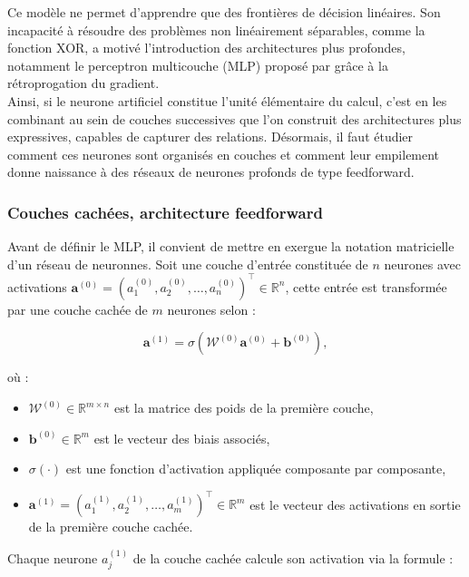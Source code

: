 Ce modèle ne permet d'apprendre que des frontières de décision linéaires. Son incapacité à résoudre des problèmes non linéairement séparables, comme la fonction XOR, a motivé l’introduction des architectures plus profondes, notamment le perceptron multicouche (MLP) proposé par \citep{rumelhart1986learning} grâce à la rétroprogation du gradient.\\

Ainsi, si le neurone artificiel constitue l’unité élémentaire du calcul, c’est en les combinant au sein de couches successives que l’on construit des architectures plus expressives, capables de capturer des relations. Désormais, il faut étudier comment ces neurones sont organisés en couches et comment leur empilement donne naissance à des réseaux de neurones profonds de type feedforward.

\subsubsection{Couches cachées, architecture feedforward}

Avant de définir le MLP, il convient de mettre en exergue la notation matricielle d'un réseau de neuronnes. Soit une couche d’entrée constituée de \( n \) neurones avec activations \( \mathbf{a}^{(0)} = \left(a_1^{(0)}, a_2^{(0)}, \dots, a_n^{(0)}\right)^\top \in \mathbb{R}^n \), cette entrée est transformée par une couche cachée de \( m \) neurones selon :

\begin{equation}
\mathbf{a}^{(1)} = \sigma\left( \mathbf{\mathcal{W}}^{(0)} \mathbf{a}^{(0)} + \mathbf{b}^{(0)} \right),
\end{equation}

où :
\begin{itemize}
  \item \( \mathbf{\mathcal{W}}^{(0)} \in \mathbb{R}^{m \times n} \) est la matrice des poids de la première couche,
  \item \( \mathbf{b}^{(0)} \in \mathbb{R}^{m} \) est le vecteur des biais associés,
  \item \( \sigma(\cdot) \) est une fonction d’activation appliquée composante par composante,
  \item \( \mathbf{a}^{(1)} = \left(a_1^{(1)}, a_2^{(1)}, \dots, a_m^{(1)}\right)^\top \in \mathbb{R}^m \) est le vecteur des activations en sortie de la première couche cachée.
\end{itemize}

Chaque neurone \( a_j^{(1)} \) de la couche cachée calcule son activation via la formule :

